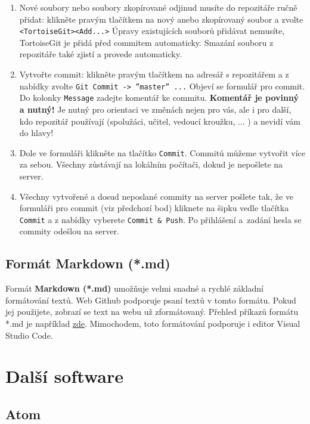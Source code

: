 \begin{enumerate}
	\item Nové soubory nebo soubory zkopírované odjinud musíte do repozitáře ručně přidat: 
	klikněte pravým tlačítkem na nový anebo zkopírovaný soubor a zvolte {\tt <TortoiseGit><Add...>} 
	Úpravy existujících souborů přidávat nemusíte, TortoiseGit je přidá před commitem automaticky. 
	Smazání souboru z repozitáře také zjistí a provede automaticky.
	
	\item Vytvořte commit: klikněte pravým tlačítkem na adresář s repozitářem a z nabídky zvolte {\tt Git Commit -> ''master'' ...}
	Objeví se formulář pro commit. Do kolonky {\tt Message} zadejte komentář ke commitu. 
	{\bf Komentář je povinný a nutný!} 
	Je nutný pro orientaci ve změnách nejen pro vás, ale i pro další, kdo repozitář používají (spolužáci, učitel, vedoucí kroužku, ... )  a nevidí vám do hlavy!
	
	\item Dole ve formuláři klikněte na tlačítko {\tt Commit}. Commitů můžeme vytvořit více za sebou. Všechny zůstávají na lokálním počítači, dokud je nepošlete na server.
	
	\item Všechny vytvořené a dosud neposlané commity na server pošlete tak, že ve formuláři pro commit (viz předchozí bod) kliknete 
	na šipku vedle tlačítka {\tt Commit} a z nabídky vyberete {\tt Commit \& Push}. Po přihlášení a~zadání hesla se commity odešlou na server.	
\end{enumerate}

 
 \subsection{Formát Markdown (*.md) }  
 
Formát \textbf{Markdown (*.md) } umožňuje velmi snadné a rychlé základní formátování textů. 
Web Github podporuje psaní textů v tomto formátu. 
Pokud jej použijete, zobrazí se text na webu už zformátovaný. 
Přehled příkazů formátu *.md je například \href{https://guides.github.com/pdfs/markdown-cheatsheet-online.pdf}{zde}.
 Mimochodem, toto formátování podporuje i editor Visual Studio Code.
 
\section{Další software}

\subsection{Atom} 

